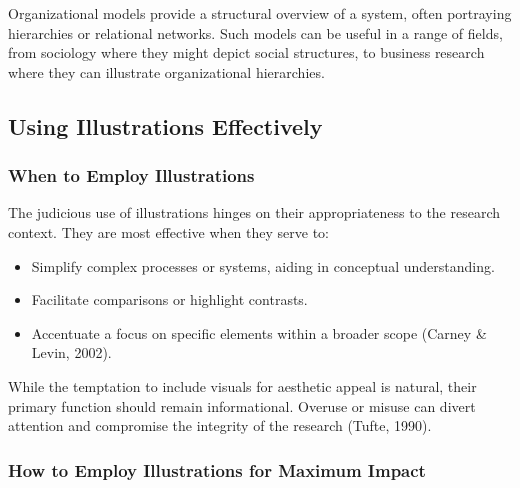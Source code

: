 \documentclass[
  b5paper]{book}
\providecommand{\tightlist}{%
  \setlength{\itemsep}{0pt}\setlength{\parskip}{0pt}}
\begin{document}
Organizational models provide a structural overview of a system, often portraying hierarchies or relational networks. Such models can be useful in a range of fields, from sociology where they might depict social structures, to business research where they can illustrate organizational hierarchies.

\hypertarget{using-illustrations-effectively}{%
\subsection*{Using Illustrations Effectively}\label{using-illustrations-effectively}}

\hypertarget{when-to-employ-illustrations}{%
\subsubsection*{When to Employ Illustrations}\label{when-to-employ-illustrations}}

The judicious use of illustrations hinges on their appropriateness to the research context. They are most effective when they serve to:

\begin{itemize}
\tightlist
\item
  Simplify complex processes or systems, aiding in conceptual understanding.
\item
  Facilitate comparisons or highlight contrasts.
\item
  Accentuate a focus on specific elements within a broader scope (Carney \& Levin, 2002).
\end{itemize}

While the temptation to include visuals for aesthetic appeal is natural, their primary function should remain informational. Overuse or misuse can divert attention and compromise the integrity of the research (Tufte, 1990).

\hypertarget{how-to-employ-illustrations-for-maximum-impact}{%
\subsubsection*{How to Employ Illustrations for Maximum Impact}\label{how-to-employ-illustrations-for-maximum-impact}}
\end{document}

